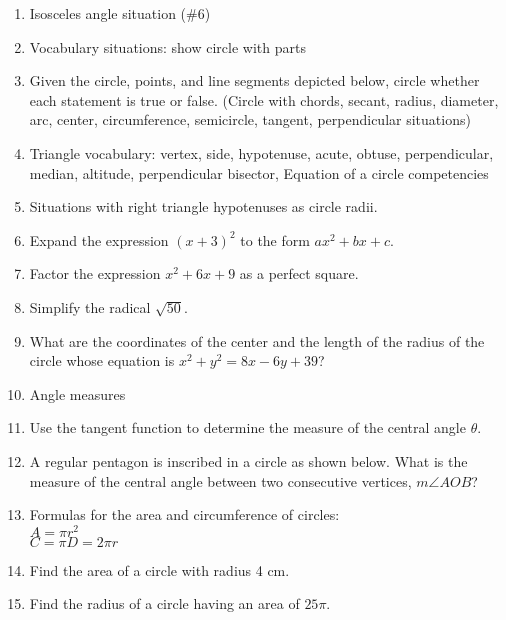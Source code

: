 \documentclass[12pt, twoside]{article}
\begin{document}
\begin{enumerate}
    \item Isosceles angle situation (\#6)
    \item Vocabulary situations: show circle with parts
    
    \item Given the circle, points, and line segments depicted below, circle whether each statement is true or false.
    (Circle with chords, secant, radius, diameter, arc, center, circumference, semicircle, tangent, perpendicular situations)
    
    \item Triangle vocabulary: vertex, side, hypotenuse, acute, obtuse, perpendicular, median, altitude, perpendicular bisector,
    {Equation of a circle competencies}

    \item Situations with right triangle hypotenuses as circle radii. 

\item Expand the expression $(x+3)^2$ to the form $ax^2+bx+c$.
\item Factor the expression $x^2+6x+9$ as a perfect square.
\item Simplify the radical $\sqrt{50}$.

\item What are the coordinates of the center and the length of the radius of the circle whose equation is $x^2 + y^2 = 8x -6y +39$?

\item Angle measures
\item Use the tangent function to determine the measure of the central angle $\theta$.
\item A regular pentagon is inscribed in a circle as shown below. What is the measure of the central angle between two consecutive vertices, $m\angle AOB$?

\item Formulas for the area and circumference of circles:\\
$A=\pi r^2$\\
$C=\pi D = 2\pi r$

\item Find the area of a circle with radius 4 cm.
\item Find the radius of a circle having an area of $25 \pi$.



\end{enumerate}
\end{document}
